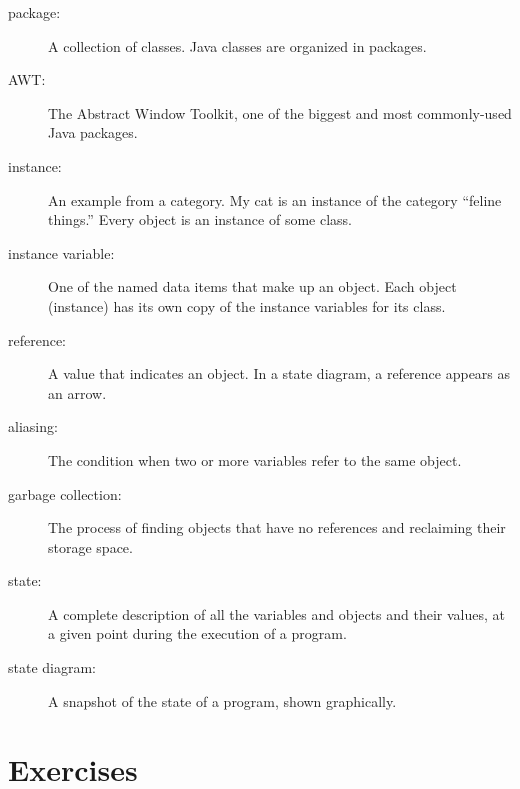 \documentclass[12pt]{book}
\theoremstyle{definition}
\begin{document}
\begin{description}

\item[package:]  A collection of classes.  Java
classes are organized in packages.

\item[AWT:]  The Abstract Window Toolkit, one of the biggest
and most commonly-used Java packages.

\item[instance:]  An example from a category.  My cat is an
instance of the category ``feline things.''  Every object is
an instance of some class.

\item[instance variable:]  One of the named data items that make
up an object.  Each object (instance) has its own copy of
the instance variables for its class.

\item[reference:]  A value that indicates an object.  In a
state diagram, a reference appears as an arrow.

\item[aliasing:] The condition when two or more variables refer
to the same object.

\item[garbage collection:]  The process of finding objects that
have no references and reclaiming their storage space.

\item[state:] A complete description of all the variables and
objects and their values, at a given point during the execution
of a program.

\item[state diagram:] A snapshot of the state of a program, shown
graphically.


\end{description}


\section{Exercises}
\end{document}
